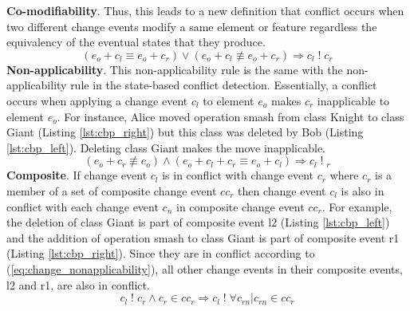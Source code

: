 \textbf{Co-modifiability}. Thus, this leads to a new definition that conflict occurs when two different change events modify a same element or feature regardless the equivalency of the eventual states that they produce. 
\begin{equation} \label{eq:change_comodifiabilty}
(e_{o} + c_{l} \equiv e_{o} + c_{r}) \vee (e_{o} + c_{l} \not\equiv e_{o} + c_{r}) \Rightarrow c_{l}\;!\;c_{r}
\end{equation} 
\textbf{Non-applicability}. This non-applicability rule is the same with the non-applicability rule in the state-based conflict detection. Essentially, a conflict occurs when applying a change event $c_{l}$ to element $e_{o}$ makes $c_{r}$ inapplicable to element $e_{o}$. For instance, Alice moved operation \textsf{smash} from class \textsf{Knight} to class \textsf{Giant} (Listing \ref{lst:cbp_right}) but this class was deleted by Bob (Listing \ref{lst:cbp_left}). Deleting class \textsf{Giant} makes the move inapplicable. 
\begin{equation} \label{eq:change_nonapplicability}
(e_{o} + c_{r} \not\equiv e_{o}) \wedge (e_{o} + c_{l} + c_{r} \equiv e_{o} + c_{l}) \Rightarrow c_{l}\;!\;_{r}
\end{equation}
\textbf{Composite}. If change event $c_{l}$ is in conflict with change event $c_{r}$ where $c_{r}$ is a member of a set of composite change event $cc_{r}$ then change event $c_{l}$ is also in conflict with each change event $c_{n}$ in composite change event $cc_{r}$. For example, the deletion of class \textsf{Giant} is part of composite event \textsf{l2} (Listing \ref{lst:cbp_left}) and the addition of operation \textsf{smash} to class \textsf{Giant} is part of composite event \textsf{r1} (Listing \ref{lst:cbp_right}). Since they are in conflict according to (\ref{eq:change_nonapplicability}), all other change events in their composite events, \textsf{l2} and \textsf{r1}, are also in conflict.
\begin{equation} \label{eq:change_composite}
c_{l}\;!\;c_{r} \wedge c_{r} \in cc_{r} \Rightarrow c_{l}\;!\; \forall c_{rn} | c_{rn} \in cc_{r}
\end{equation}

